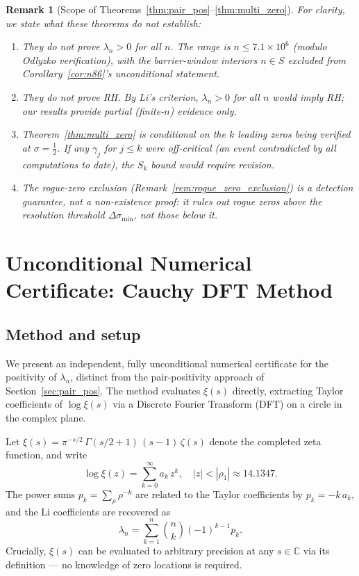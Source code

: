 \documentclass[11pt]{article}
\newtheorem{remark}[theorem]{Remark}
\begin{document}
\begin{remark}[Scope of Theorems~\ref{thm:pair_pos}--\ref{thm:multi_zero}]
\label{rem:scope_limits}
For clarity, we state what these theorems do \emph{not} establish:
\begin{enumerate}
\item[(i)] They do not prove $\lambda_n > 0$ for \emph{all} $n$. The range is
  $n \le 7.1\times10^6$ (modulo Odlyzko verification), with the barrier-window interiors
  $n \in S$ excluded from Corollary~\ref{cor:n86}'s unconditional statement.
\item[(ii)] They do not prove RH. By Li's criterion, $\lambda_n > 0$ for all $n$
  \emph{would} imply RH; our results provide partial (finite-$n$) evidence only.
\item[(iii)] Theorem~\ref{thm:multi_zero} is conditional on the $k$ leading zeros
  being verified at $\sigma = \tfrac{1}{2}$. If any $\gamma_j$ for $j \le k$ were
  off-critical (an event contradicted by all computations to date), the $S_k$ bound
  would require revision.
\item[(iv)] The rogue-zero exclusion (Remark~\ref{rem:rogue_zero_exclusion}) is a
  detection guarantee, not a non-existence proof: it rules out rogue zeros above
  the resolution threshold $\Delta\sigma_{\min}$, not those below it.
\end{enumerate}
\end{remark}

\section{Unconditional Numerical Certificate: Cauchy DFT Method}
\label{sec:cauchy_dft}

\subsection{Method and setup}

We present an independent, fully unconditional numerical certificate for the positivity
of $\lambda_n$, distinct from the pair-positivity approach of Section~\ref{sec:pair_pos}.
The method evaluates $\xi(s)$ directly, extracting Taylor coefficients of $\log\xi(s)$
via a Discrete Fourier Transform (DFT) on a circle in the complex plane.

Let $\xi(s) = \pi^{-s/2}\,\Gamma(s/2+1)\,(s-1)\,\zeta(s)$ denote the completed zeta
function, and write
\begin{equation}
  \log\xi(z) = \sum_{k=0}^\infty a_k\,z^k,\quad |z| < |\rho_1| \approx 14.1347.
\end{equation}
The power sums $p_k = \sum_\rho \rho^{-k}$ are related to the Taylor coefficients by
$p_k = -k\,a_k$, and the Li coefficients are recovered as
\begin{equation}
  \lambda_n = \sum_{k=1}^n \binom{n}{k}(-1)^{k-1}p_k.
\end{equation}
Crucially, $\xi(s)$ can be evaluated to arbitrary precision at any $s \in \mathbb{C}$
via its definition — no knowledge of zero locations is required.
\end{document}
